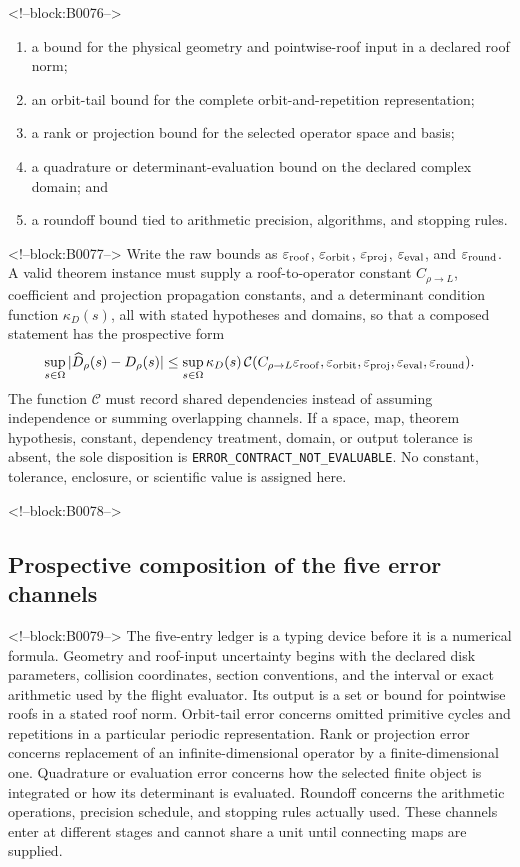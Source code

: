 \documentclass[11pt,a4paper]{article}
\providecommand{\tightlist}{\setlength{\itemsep}{0pt}\setlength{\parskip}{0pt}}
\begin{document}
<!--block:B0076-->
\begin{enumerate}
\def\labelenumi{\arabic{enumi}.}
\tightlist
\item
  a bound for the physical geometry and pointwise-roof input in a declared roof norm;
\item
  an orbit-tail bound for the complete orbit-and-repetition representation;
\item
  a rank or projection bound for the selected operator space and basis;
\item
  a quadrature or determinant-evaluation bound on the declared complex domain; and
\item
  a roundoff bound tied to arithmetic precision, algorithms, and stopping rules.
\end{enumerate}

<!--block:B0077-->
Write the raw bounds as \(\varepsilon_{\rm roof}\), \(\varepsilon_{\rm orbit}\), \(\varepsilon_{\rm proj}\), \(\varepsilon_{\rm eval}\), and \(\varepsilon_{\rm round}\). A valid theorem instance must supply a roof-to-operator constant \(C_{\rho\to L}\), coefficient and projection propagation constants, and a determinant condition function \(\kappa_D(s)\), all with stated hypotheses and domains, so that a composed statement has the prospective form
\[
 \sup_{s\in\Omega}|\widehat D_\rho(s)-D_\rho(s)|\leq\sup_{s\in\Omega}\kappa_D(s)\,\mathcal{C}(C_{\rho\to L}\varepsilon_{\rm roof},\varepsilon_{\rm orbit},\varepsilon_{\rm proj},\varepsilon_{\rm eval},\varepsilon_{\rm round}).
\]
The function \(\mathcal{C}\) must record shared dependencies instead of assuming independence or summing overlapping channels. If a space, map, theorem hypothesis, constant, dependency treatment, domain, or output tolerance is absent, the sole disposition is \texttt{ERROR\_CONTRACT\_NOT\_EVALUABLE}. No constant, tolerance, enclosure, or scientific value is assigned here.

<!--block:B0078-->
\subsection{Prospective composition of the five error channels}

<!--block:B0079-->
The five-entry ledger is a typing device before it is a numerical formula. Geometry and roof-input uncertainty begins with the declared disk parameters, collision coordinates, section conventions, and the interval or exact arithmetic used by the flight evaluator. Its output is a set or bound for pointwise roofs in a stated roof norm. Orbit-tail error concerns omitted primitive cycles and repetitions in a particular periodic representation. Rank or projection error concerns replacement of an infinite-dimensional operator by a finite-dimensional one. Quadrature or evaluation error concerns how the selected finite object is integrated or how its determinant is evaluated. Roundoff concerns the arithmetic operations, precision schedule, and stopping rules actually used. These channels enter at different stages and cannot share a unit until connecting maps are supplied.
\end{document}

